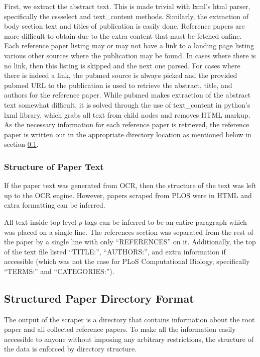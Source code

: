\documentclass[10pt, conference, compsocconf]{IEEEtran}
\begin{document}
First, we extract the abstract text. This is made trivial with lxml's html
parser, specifically the cssselect and text\_content methods. Similarly, the
extraction of body section text and titles of publication is easily done.
Reference papers are more difficult to obtain due to the extra content that
must be fetched online. Each reference paper listing may or may not have a link
to a landing page listing various other sources where the publication may be
found. In cases where there is no link, then this listing is skipped and the
next one parsed. For cases where there is indeed a link, the pubmed source is
always picked and the provided pubmed URL to the publication is used to
retrieve the abstract, title, and authors for the reference paper. While pubmed
makes extraction of the abstract text somewhat difficult, it is solved through
the use of text\_content in python's lxml library, which grabs all text from
child nodes and removes HTML markup. As the necessary information for each
reference paper is retrieved, the reference paper is written out in the
appropriate directory location as mentioned below in section
\ref{sec:dir_structure}.

\subsubsection{Structure of Paper Text}\label{sec:text_structure}
If the paper text was generated from OCR, then the structure of the text was
left up to the OCR engine. However, papers scraped from PLOS were in HTML and
extra formatting can be inferred.

All text inside top-level $p$ tags can be inferred to be an entire paragraph
which was placed on a single line. The references section was separated from the
rest of the paper by a single line with only ``REFERENCES'' on it.
Additionally, the top of the text file listed ``TITLE:'', ``AUTHORS:'', and
extra information if accessible (which was not the case for PLoS Computational
Biology, specifically ``TERMS:'' and ``CATEGORIES:'').

\subsection{Structured Paper Directory Format}\label{sec:dir_structure}
The output of the scraper is a directory that contains information about the
root paper and all collected reference papers. To make all the
information easily accessible to anyone without imposing any arbitrary
restrictions, the structure of the data is enforced by directory structure.
\end{document}
